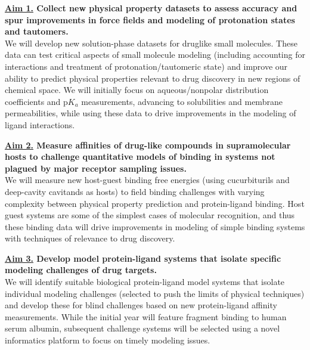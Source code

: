\documentclass[11pt]{article}
\begin{document}
{\bf \underline{Aim 1.} Collect new physical property datasets to assess accuracy and spur improvements in force fields and modeling of protonation states and tautomers.}\\
We will develop new solution-phase datasets for druglike small molecules. 
These data can test critical aspects of small molecule modeling (including accounting for interactions and treatment of protonation/tautomeric state) and improve our ability to predict physical properties relevant to drug discovery in new regions of chemical space. 
We will initially focus on aqueous/nonpolar distribution coefficients and p$K_a$ measurements, advancing to solubilities and membrane permeabilities, while using these data to drive improvements in the modeling of ligand interactions.


{\bf \underline{Aim 2.} Measure affinities of drug-like compounds in supramolecular hosts to challenge quantitative models of binding in systems not plagued by major receptor sampling issues.}\\
We will measure new host-guest binding free energies (using cucurbiturils and deep-cavity cavitands as hosts) to field binding challenges with varying complexity between physical property prediction and protein-ligand binding. 
Host guest systems are some of the simplest cases of molecular recognition, and thus these binding data will drive improvements in modeling of simple binding systems with techniques of relevance to drug discovery.

{\bf \underline{Aim 3.} Develop model protein-ligand systems that isolate specific modeling challenges of drug targets.}\\
We will identify suitable biological protein-ligand model systems that isolate individual modeling challenges (selected to push the limits of physical techniques) and develop these for blind challenges based on new protein-ligand affinity measurements.
While the initial year will feature fragment binding to human serum albumin, subsequent challenge systems will be selected using a novel informatics platform to focus on timely modeling issues.
\end{document}
